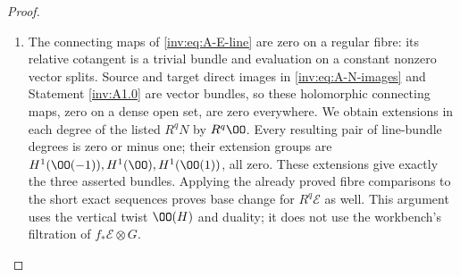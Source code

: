\begin{proof}
\begin{enumerate}[label=\arabic*.,leftmargin=*]
\item The connecting maps of \eqref{inv:eq:A-E-line} are zero on a regular
fibre: its relative cotangent is a trivial bundle and evaluation on
a constant nonzero vector splits.  Source and target direct images
in \eqref{inv:eq:A-N-images} and Statement \ref{inv:A1.0} are vector bundles,
so these holomorphic connecting maps, zero on a dense open set, are
zero everywhere.  We obtain extensions in each degree of the listed
$R^qN$ by $R^q\OO$.  Every resulting pair of line-bundle degrees is
zero or minus one; their extension groups are
$H^1(\OO(-1)),H^1(\OO),H^1(\OO(1))$, all zero.  These extensions
give exactly the three asserted bundles.  Applying the already proved
fibre comparisons to the short exact sequences proves base change
for $R^q\mathcal E$ as well.  This argument uses the vertical twist
$\OO(H)$ and duality; it does not use the workbench's filtration of
$f_*\mathcal E\otimes G$.
\end{enumerate}
\end{proof}

